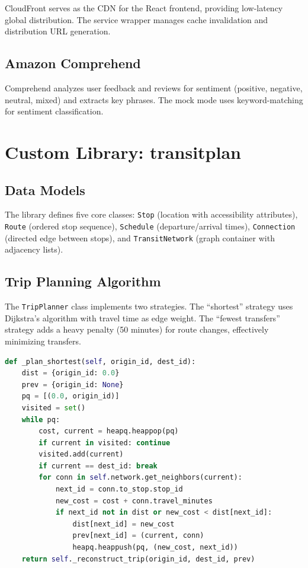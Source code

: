 \documentclass[conference]{IEEEtran}
\begin{document}
CloudFront serves as the CDN for the React frontend, providing low-latency global distribution. The service wrapper manages cache invalidation and distribution URL generation.

\subsection{Amazon Comprehend}

Comprehend analyzes user feedback and reviews for sentiment (positive, negative, neutral, mixed) and extracts key phrases. The mock mode uses keyword-matching for sentiment classification.

\section{Custom Library: transitplan}

\subsection{Data Models}

The library defines five core classes: \texttt{Stop} (location with accessibility attributes), \texttt{Route} (ordered stop sequence), \texttt{Schedule} (departure/arrival times), \texttt{Connection} (directed edge between stops), and \texttt{TransitNetwork} (graph container with adjacency lists).

\subsection{Trip Planning Algorithm}

The \texttt{TripPlanner} class implements two strategies. The ``shortest'' strategy uses Dijkstra's algorithm with travel time as edge weight. The ``fewest transfers'' strategy adds a heavy penalty (50 minutes) for route changes, effectively minimizing transfers.

\begin{lstlisting}[language=Python, caption=Trip planning with Dijkstra's algorithm]
def _plan_shortest(self, origin_id, dest_id):
    dist = {origin_id: 0.0}
    prev = {origin_id: None}
    pq = [(0.0, origin_id)]
    visited = set()
    while pq:
        cost, current = heapq.heappop(pq)
        if current in visited: continue
        visited.add(current)
        if current == dest_id: break
        for conn in self.network.get_neighbors(current):
            next_id = conn.to_stop.stop_id
            new_cost = cost + conn.travel_minutes
            if next_id not in dist or new_cost < dist[next_id]:
                dist[next_id] = new_cost
                prev[next_id] = (current, conn)
                heapq.heappush(pq, (new_cost, next_id))
    return self._reconstruct_trip(origin_id, dest_id, prev)
\end{lstlisting}
\end{document}
